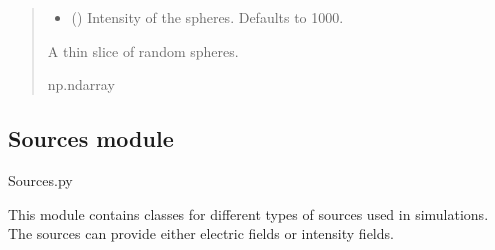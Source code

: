 \documentclass[letterpaper,10pt,english]{sphinxmanual}
\begin{document}
\begin{fulllineitems}
\begin{quote}
\begin{description}
\begin{itemize}
\item {} 
\sphinxAtStartPar
{} (\sphinxstyleliteralemphasis{\sphinxupquote{, }}) \textendash{} Intensity of the spheres. Defaults to 1000.

\end{itemize}

\sphinxAtStartPar
A thin slice of random spheres.

\sphinxAtStartPar
np.ndarray

\end{description}\end{quote}

\end{fulllineitems}


\sphinxstepscope


\subsection{Sources module}
\label{\detokenize{source/Sources:module-Sources}}\label{\detokenize{source/Sources:sources-module}}\label{\detokenize{source/Sources::doc}}
\sphinxAtStartPar
Sources.py

\sphinxAtStartPar
This module contains classes for different types of sources used in simulations.
The sources can provide either electric fields or intensity fields.

\end{document}
